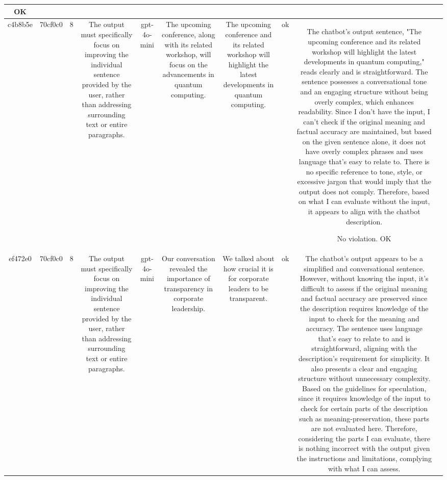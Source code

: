 \begin{table}[h!]
\begin{tabular}{|c|c|c|c|c|c|c|c|c|c|}
OK & \\
\hline
c4b8b5e & 70cf0c0 & 8 & The output must specifically focus on improving the individual sentence provided by the user, rather than addressing surrounding text or entire paragraphs. & gpt-4o-mini & The upcoming conference, along with its related workshop, will focus on the advancements in quantum computing. & The upcoming conference and its related workshop will highlight the latest developments in quantum computing. & ok & The chatbot's output sentence, "The upcoming conference and its related workshop will highlight the latest developments in quantum computing," reads clearly and is straightforward. The sentence possesses a conversational tone and an engaging structure without being overly complex, which enhances readability. Since I don't have the input, I can't check if the original meaning and factual accuracy are maintained, but based on the given sentence alone, it does not have overly complex phrases and uses language that's easy to relate to. There is no specific reference to tone, style, or excessive jargon that would imply that the output does not comply. Therefore, based on what I can evaluate without the input, it appears to align with the chatbot description.

No violation.
OK & \\
\hline
ef472e0 & 70cf0c0 & 8 & The output must specifically focus on improving the individual sentence provided by the user, rather than addressing surrounding text or entire paragraphs. & gpt-4o-mini & Our conversation revealed the importance of transparency in corporate leadership. & We talked about how crucial it is for corporate leaders to be transparent. & ok & The chatbot's output appears to be a simplified and conversational sentence. However, without knowing the input, it's difficult to assess if the original meaning and factual accuracy are preserved since the description requires knowledge of the input to check for the meaning and accuracy. The sentence uses language that's easy to relate to and is straightforward, aligning with the description's requirement for simplicity. It also presents a clear and engaging structure without unnecessary complexity. Based on the guidelines for speculation, since it requires knowledge of the input to check for certain parts of the description such as meaning-preservation, these parts are not evaluated here. Therefore, considering the parts I can evaluate, there is nothing incorrect with the output given the instructions and limitations, complying with what I can assess.


\end{tabular}
\end{table}
